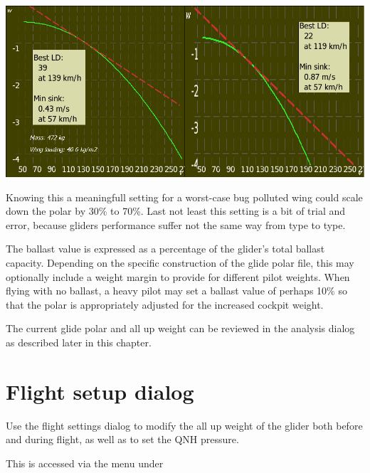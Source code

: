 \documentclass[a4paper,12pt]{refrep}
\begin{document}
\begin{center}
\includegraphics[angle=0,width=\linewidth,keepaspectratio='true']{figures/cut-clean-dirty-polar.png}
\end{center}
Knowing this a meaningfull setting for a worst-case bug polluted wing could
scale down the polar by 30\% to 70\%. Last not least this setting is a bit of 
trial and error, because gliders performance suffer not the same way from type
to type.

The ballast value is expressed as a percentage of the glider's total
ballast capacity.  Depending on the specific construction of the glide
polar file, this may optionally include a weight margin to provide for
different pilot weights.  When flying with no ballast, a heavy pilot
may set a ballast value of perhaps 10\% so that the polar is
appropriately adjusted for the increased cockpit weight.


The current glide polar and all up weight can be reviewed in the
analysis dialog as described later in this chapter.

\section{Flight setup dialog}\label{sec:basic-sett-dial}
Use the flight settings dialog to modify the all up weight of the glider both
before and during flight, as well as to set the QNH pressure.  

This is accessed via the menu under 
\begin{quote}
\blink{}
\end{quote}
\end{document}

